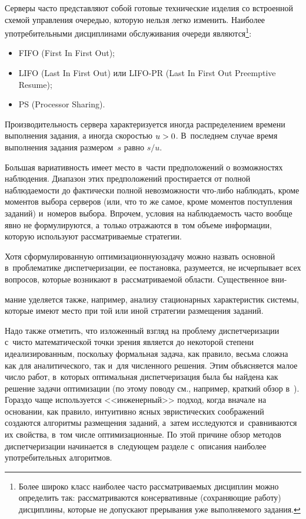 \begin{multicols}{2}
Серверы часто представляют собой готовые технические изделия со встроенной схемой управления 
очередью, которую нельзя легко изменить. Наиболее употребительными дисциплинами обслуживания 
очереди являются\footnote{Более широко класс наиболее часто рассматриваемых дисциплин можно 
определить так: рассматриваются консервативные (сохраняющие работу) дисциплины, которые не 
допускают прерывания уже выполняемого задания.}:
\begin{itemize}
\item FIFO (First In First Out);
    \item LIFO (Last In First Out) или LIFO-PR (Last In First Out Preemptive Resume);
    \item PS (Processor Sharing).
    \end{itemize}
    
    Производительность сервера характеризуется иногда распределением времени 
выполнения задания, а иногда скоростью $u\hm>0$. В~последнем случае время 
выполнения задания размером~$s$ равно $s/u$.
    
    Большая вариативность имеет место в~части предположений о возможностях 
наблюдения. Диапазон этих предположений простирается от полной наблюдаемости до 
фактически полной невозможности что-либо наблюдать, кроме моментов выбора серверов 
(или, что то же самое, кроме моментов поступления заданий) и~номеров выбора. Впрочем, 
условия на наблюдаемость часто вообще явно не формулируются, а~только отражаются 
в~том объеме информации, которую используют рассматри\-ва\-емые стратегии.
    
    Хотя сформулированную оптимизационную\linebreak задачу можно назвать основной 
в~проблематике диспетчеризации, ее постановка, разумеется, не ис\-черпывает всех 
вопросов, которые возникают в~рассматриваемой области. Существенное вни-\linebreak\vspace*{-12pt}

\columnbreak

\noindent
мание 
уделяется также, например, анализу стационарных характеристик системы, которые 
имеют место при той или иной стратегии размещения заданий.
    
    Надо также отметить, что изложенный взгляд на проблему диспетчеризации с~чисто 
математической точки зрения является до некоторой степени идеализированным, 
поскольку формальная задача, как правило, весьма сложна как для аналитического, так 
и~для численного решения. Этим объясняется малое число работ, в~которых оптимальная 
диспетчеризация была бы найдена как решение задачи оптимизации (по этому поводу см., 
например, краткий обзор в~\cite{2-kon}). Гораздо чаще используется <<инженерный>> 
подход, когда вначале на основании, как правило, интуитивно ясных эвристических 
соображений создаются алгоритмы размещения заданий, а~затем исследуются 
и~сравниваются их свойства, в~том числе оптимизационные. По этой причине обзор методов 
диспетчеризации начинается в~следующем разделе с~описания наиболее употребительных 
алгоритмов.


\end{multicols}
